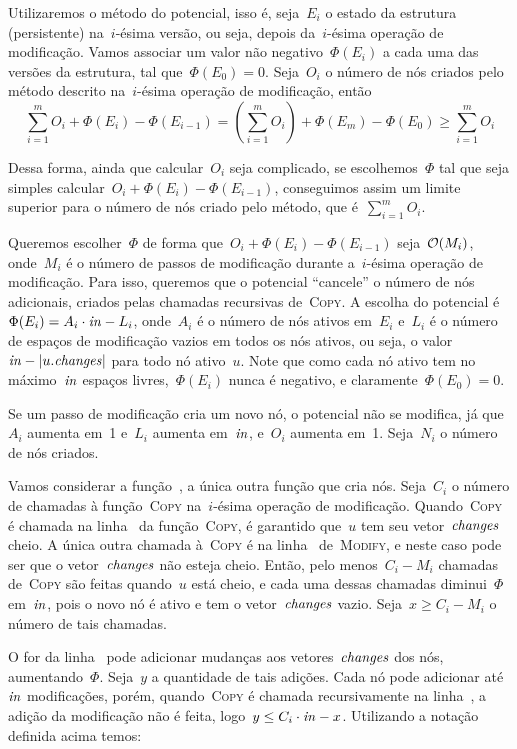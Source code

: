 \documentclass[../../main.tex]{subfiles}
\begin{document}
Utilizaremos o método do potencial, isso é, seja~$E_i$ o estado da estrutura (persistente) na~$i$-ésima versão, ou seja, depois da~$i$-ésima operação de modificação. Vamos associar um valor não negativo~$\Phi(E_i)$ a cada uma das versões da estrutura, tal que~$\Phi(E_0) = 0$. Seja~$O_i$ o número de nós criados pelo método descrito na~$i$-ésima operação de modificação, então
$$ \sum\limits_{i=1}^{m}{O_i + \Phi(E_i) - \Phi(E_{i-1})} = \left(\sum\limits_{i=1}^m{O_i}\right) + \Phi(E_m) - \Phi(E_0) \geq \sum\limits_{i=1}^m{O_i} $$

Dessa forma, ainda que calcular~$O_i$ seja complicado, se escolhemos~$\Phi$ tal que seja simples calcular~${O_i + \Phi(E_i) - \Phi(E_{i-1})}$, conseguimos assim um limite superior para o número de nós criado pelo método, que é~$\sum\limits_{i=1}^m{O_i}$.

Queremos escolher~$\Phi$ de forma que~${O_i + \Phi(E_i) - \Phi(E_{i-1})}$ seja~$\mathcal{O}(M_i)$, onde~$M_i$ é o número de passos de modificação durante a~$i$-ésima operação de modificação. Para isso, queremos que o potencial ``cancele'' o número de nós adicionais, criados pelas chamadas recursivas de~\textsc{Copy}. A escolha do potencial é~$\Phi(E_i) = A_i \cdot \mathit{in} - L_i$, onde~$A_i$ é o número de nós ativos em~$E_i$ e~$L_i$ é o número de espaços de modificação vazios em todos os nós ativos, ou seja, o valor~$\mathit{in} - |u.\mathit{changes}|$ para todo nó ativo~$u$. Note que como cada nó ativo tem no máximo~$\mathit{in}$ espaços livres,~$\Phi(E_i)$ nunca é negativo, e claramente~$\Phi(E_0) = 0$.

Se um passo de modificação cria um novo nó, o potencial não se modifica, já que~$A_i$ aumenta em~1 e~$L_i$ aumenta em~$\mathit{in}$, e~$O_i$ aumenta em~1. Seja~$N_i$ o número de nós criados.

Vamos considerar a função~, a única outra função que cria nós. Seja~$C_i$ o número de chamadas à função~\textsc{Copy} na~$i$-ésima operação de modificação. Quando~\textsc{Copy} é chamada na linha~ da função~\textsc{Copy}, é garantido que~$u$ tem seu vetor~$\mathit{changes}$ cheio. A única outra chamada à~\textsc{Copy} é na linha~ de~\textsc{Modify}, e neste caso pode ser que o vetor~$\mathit{changes}$ não esteja cheio. Então, pelo menos~$C_i - M_i$ chamadas de~\textsc{Copy} são feitas quando~$u$ está cheio, e cada uma dessas chamadas diminui~$\Phi$ em~$\mathit{in}$, pois o novo nó é ativo e tem o vetor~$\mathit{changes}$ vazio. Seja~$x \geq C_i - M_i$ o número de tais chamadas.

O for da linha~ pode adicionar mudanças aos vetores~$\mathit{changes}$ dos nós, aumentando~$\Phi$. Seja~$y$ a quantidade de tais adições. Cada nó pode adicionar até~$\mathit{in}$ modificações, porém, quando~\textsc{Copy} é chamada recursivamente na linha~, a adição da modificação não é feita, logo~$y \leq C_i \cdot \mathit{in} - x$. Utilizando a notação definida acima temos:
\end{document}
